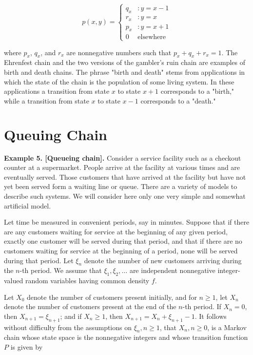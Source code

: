 \documentclass[12pt,openany]{book}
\theoremstyle{definition}
\begin{document}
	\[
	p(x,y)=\begin{cases}
		q_x &:y=x-1\\
		r_x &:y=x\\
		p_x &:y=x+1\\
		0 &\text{elsewhere}
	\end{cases}
	\]
	
	where \( p_x \), \( q_x \), and \( r_x \) are nonnegative numbers such that \( p_x + q_x + r_x = 1 \). The Ehrenfest chain and the two versions of the gambler's ruin chain are examples of birth and death chains. The phrase "birth and death" stems from applications in which the state of the chain is the population of some living system. In these applications a transition from state \( x \) to state \( x + 1 \) corresponds to a "birth," while a transition from state \( x \) to state \( x - 1 \) corresponds to a "death."
	
	\section{Queuing Chain}
	\textbf{Example 5. [Queueing chain].} Consider a service facility such as a checkout counter at a supermarket. People arrive at the facility at various times and are eventually served. Those customers that have arrived at the facility but have not yet been served form a waiting line or queue. There are a variety of models to describe such systems. We will consider here only one very simple and somewhat artificial model.
	
	Let time be measured in convenient periods, say in minutes. Suppose that if there are any customers waiting for service at the beginning of any given period, exactly one customer will be served during that period, and that if there are no customers waiting for service at the beginning of a period, none will be served during that period. Let \(\xi_n\) denote the number of new customers arriving during the \(n\)-th period. We assume that \(\xi_1, \xi_2, \ldots\) are independent nonnegative integer-valued random variables having common density \(f\).
	
	Let \(X_0\) denote the number of customers present initially, and for \(n \geq 1\), let \(X_n\) denote the number of customers present at the end of the \(n\)-th period. If \(X_n = 0\), then \(X_{n+1} = \xi_{n+1}\); and if \(X_n \geq 1\), then \(X_{n+1} = X_n + \xi_{n+1} - 1\). It follows without difficulty from the assumptions on \(\xi_n, n \geq 1\), that \(X_n, n \geq 0\), is a Markov chain whose state space is the nonnegative integers and whose transition function \(P\) is given by
	
\end{document}
